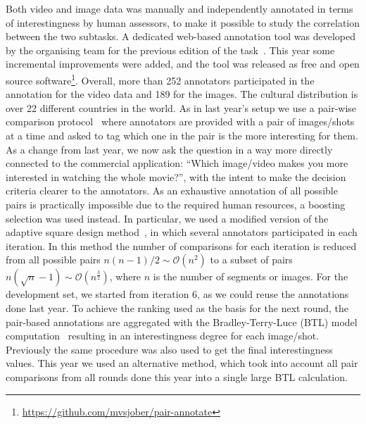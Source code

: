 \documentclass[sigconf]{acmart-me}
\begin{document}
Both video and image data was manually and independently annotated in terms of interestingness by human assessors, to make it possible to study the correlation between the two subtasks.
A dedicated web-based annotation tool was developed by the organising team for the previous edition of the task~\cite{demarty2016mediaeval}. 
This year some incremental improvements were added, and the tool was released as free and open source software\footnote{\url{https://github.com/mvsjober/pair-annotate}}.
Overall, more than 252 annotators participated in the annotation for the video data and 189 for the images.
The cultural distribution is over 22 different countries in the world.
As in last year's setup we use a pair-wise comparison protocol~\cite{Bradley} where annotators are provided with a pair of images/shots at a time and asked to tag which one in the pair is the more interesting for them.
As a change from last year, we now ask the question in a way more directly connected to the commercial application: ``Which image/video makes you more interested in watching the whole movie?'', with the intent to make the decision criteria clearer to the annotators.
As an exhaustive annotation of all possible pairs is practically impossible due to the required human resources, a boosting selection was used instead.
In particular, we used a modified version of the adaptive square design method~\cite{Li-SPIE2013}, in which several annotators participated in each iteration.  
In this method the number of comparisons for each iteration is reduced from all possible pairs $n(n-1)/2 \sim \mathcal{O}(n^2)$ to a subset of pairs $n(\sqrt{n}-1) \sim \mathcal{O}(n^{\frac{3}{2}})$, where $n$ is the number of segments or images.
For the development set, we started from iteration 6, as we could reuse the annotations done last year.
To achieve the ranking used as the basis for the next round, the pair-based annotations are aggregated with the Bradley-Terry-Luce (BTL) model computation~\cite{Bradley} resulting in an interestingness degree for each image/shot.
Previously the same procedure was also used to get the final interestingness values.
This year we used an alternative method, which took into account all pair comparisons from all rounds done this year into a single large BTL calculation.
\end{document}
